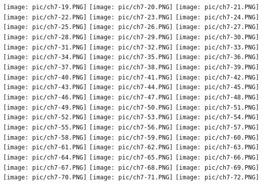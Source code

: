 \documentclass[UTF-8]{ctexart}
\begin{document}
\begin{center}
    \texttt{[image: pic/ch7-19.PNG]}
    \texttt{[image: pic/ch7-20.PNG]}
    \texttt{[image: pic/ch7-21.PNG]}
    \texttt{[image: pic/ch7-22.PNG]}
    \texttt{[image: pic/ch7-23.PNG]}
    \texttt{[image: pic/ch7-24.PNG]}
    \texttt{[image: pic/ch7-25.PNG]}
    \texttt{[image: pic/ch7-26.PNG]}
    \texttt{[image: pic/ch7-27.PNG]}
    \texttt{[image: pic/ch7-28.PNG]}
    \texttt{[image: pic/ch7-29.PNG]}
    \texttt{[image: pic/ch7-30.PNG]}
    \texttt{[image: pic/ch7-31.PNG]}
    \texttt{[image: pic/ch7-32.PNG]}
    \texttt{[image: pic/ch7-33.PNG]}
    \texttt{[image: pic/ch7-34.PNG]}
    \texttt{[image: pic/ch7-35.PNG]}
    \texttt{[image: pic/ch7-36.PNG]}
    \texttt{[image: pic/ch7-37.PNG]}
    \texttt{[image: pic/ch7-38.PNG]}
    \texttt{[image: pic/ch7-39.PNG]}
    \texttt{[image: pic/ch7-40.PNG]}
    \texttt{[image: pic/ch7-41.PNG]}
    \texttt{[image: pic/ch7-42.PNG]}
    \texttt{[image: pic/ch7-43.PNG]}
    \texttt{[image: pic/ch7-44.PNG]}
    \texttt{[image: pic/ch7-45.PNG]}
    \texttt{[image: pic/ch7-46.PNG]}
    \texttt{[image: pic/ch7-47.PNG]}
    \texttt{[image: pic/ch7-48.PNG]}
    \texttt{[image: pic/ch7-49.PNG]}
    \texttt{[image: pic/ch7-50.PNG]}
    \texttt{[image: pic/ch7-51.PNG]}
    \texttt{[image: pic/ch7-52.PNG]}
    \texttt{[image: pic/ch7-53.PNG]}
    \texttt{[image: pic/ch7-54.PNG]}
    \texttt{[image: pic/ch7-55.PNG]}
    \texttt{[image: pic/ch7-56.PNG]}
    \texttt{[image: pic/ch7-57.PNG]}
    \texttt{[image: pic/ch7-58.PNG]}
    \texttt{[image: pic/ch7-59.PNG]}
    \texttt{[image: pic/ch7-60.PNG]}
    \texttt{[image: pic/ch7-61.PNG]}
    \texttt{[image: pic/ch7-62.PNG]}
    \texttt{[image: pic/ch7-63.PNG]}
    \texttt{[image: pic/ch7-64.PNG]}
    \texttt{[image: pic/ch7-65.PNG]}
    \texttt{[image: pic/ch7-66.PNG]}
    \texttt{[image: pic/ch7-67.PNG]}
    \texttt{[image: pic/ch7-68.PNG]}
    \texttt{[image: pic/ch7-69.PNG]}
    \texttt{[image: pic/ch7-70.PNG]}
    \texttt{[image: pic/ch7-71.PNG]}
    \texttt{[image: pic/ch7-72.PNG]}

\end{center}
\end{document}
